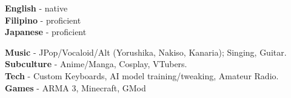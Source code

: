 \documentclass[9pt]{developercv}
\begin{document}
\vspace{0.5cm}

\begin{minipage}[t]{0.2\textwidth}
	\vspace{-\baselineskip}

	\textbf{English} - native\\
	\textbf{Filipino} - proficient\\
	\textbf{Japanese} - proficient\\
\end{minipage}
\hfill
\begin{minipage}[t]{0.6\textwidth}
	\vspace{-\baselineskip}
	
	\textbf{Music} - JPop/Vocaloid/Alt (Yorushika, Nakiso, Kanaria); Singing, Guitar.\\ \textbf{Subculture} - Anime/Manga, Cosplay, VTubers. \\
	\textbf{Tech} - Custom Keyboards, AI model training/tweaking, Amateur Radio. \\
	\textbf{Games} - ARMA 3, Minecraft, GMod
\end{minipage}
\end{document}
